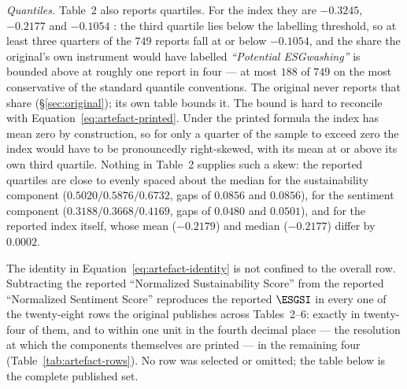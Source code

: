 \emph{Quantiles.} Table~2 also reports quartiles. For the index they are
$-0.3245$, $-0.2177$ and $-0.1054$ \citep[p.~6]{lagasio2024}: the third
quartile lies below the labelling threshold, so at least three quarters of the
$749$ reports fall at or below $-0.1054$, and the share the original's own
instrument would have labelled \emph{``Potential ESGwashing''} is bounded above
at roughly one report in four --- at most $188$ of $749$ on the most
conservative of the standard quantile conventions. The original never reports
that share (\S\ref{sec:original}); its own table bounds it. The bound is hard
to reconcile with Equation~\eqref{eq:artefact-printed}. Under the printed
formula the index has mean zero by construction, so for only a quarter of the
sample to exceed zero the index would have to be pronouncedly right-skewed,
with its mean at or above its own third quartile. Nothing in Table~2 supplies
such a skew: the reported quartiles are close to evenly spaced about the median
for the sustainability component ($0.5020 / 0.5876 / 0.6732$, gaps of $0.0856$
and $0.0856$), for the sentiment component ($0.3188 / 0.3668 / 0.4169$, gaps of
$0.0480$ and $0.0501$), and for the reported index itself, whose mean
($-0.2179$) and median ($-0.2177$) differ by $0.0002$.

The identity in Equation~\eqref{eq:artefact-identity} is not confined to the
overall row. Subtracting the reported ``Normalized Sustainability Score'' from
the reported ``Normalized Sentiment Score'' reproduces the reported $\ESGSI$ in
every one of the twenty-eight rows the original publishes across Tables~2--6:
exactly in twenty-four of them, and to within one unit in the fourth decimal
place --- the resolution at which the components themselves are printed --- in
the remaining four (Table~\ref{tab:artefact-rows}). No row was selected or
omitted; the table below is the complete published set.

